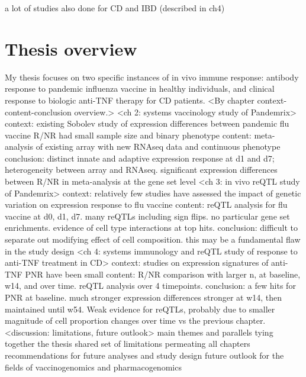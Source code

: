 \begin{outline}
\1 a lot of studies also done for CD and IBD (described in ch4)

\section{Thesis overview}

\1 My thesis focuses on two specific instances of in vivo immune response: antibody response to pandemic influenza vaccine in healthy individuals, and clinical response to biologic anti-TNF therapy for CD patients.
\1 <By chapter context-content-conclusion overview.>
    \2 <ch 2: systems vaccinology study of Pandemrix>
        \3 context: existing Sobolev study of expression differences between pandemic flu vaccine R/NR had small sample size and binary phenotype
        \3 content: meta-analysis of existing array with new RNAseq data and continuous phenotype
        \3 conclusion: distinct innate and adaptive expression response at d1 and d7; heterogeneity between array and RNAseq. significant expression differences between R/NR in meta-analysis at the gene set level
    \2 <ch 3: in vivo reQTL study of Pandemrix>
        \3 context: relatively few studies have assessed the impact of genetic variation on expression response to flu vaccine
        \3 content: reQTL analysis for flu vaccine at d0, d1, d7. many reQTLs including sign flips. no particular gene set enrichments. evidence of cell type interactions at top hits.
        \3 conclusion: difficult to separate out modifying effect of cell composition. this may be a fundamental flaw in the study design
    \2 <ch 4: systems immunology and reQTL study of response to anti-TNF treatment in CD>
        \3 context: studies on expression signatures of anti-TNF PNR have been small
        \3 content: R/NR comparison with larger n, at baseline, w14, and over time. reQTL analysis over 4 timepoints. 
        \3 conclusion: a few hits for PNR at baseline. much stronger expression differences stronger at w14, then maintained until w54. Weak evidence for reQTLs, probably due to smaller magnitude of cell proportion changes over time vs the previous chapter.
    \2 <discussion: limitations, future outlook>
        \3 main themes and parallels tying together the thesis
        \3 shared set of limitations permeating all chapters
        \3 recommendations for future analyses and study design
        \3 future outlook for the fields of vaccinogenomics and pharmacogenomics

\end{outline}

